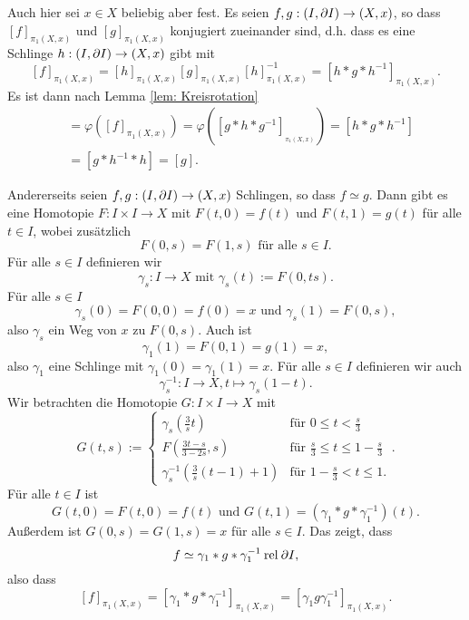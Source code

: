 \documentclass[a4paper,10pt]{article}
\begin{document}
\subsection{}
Auch hier sei $x \in X$ beliebig aber fest. Es seien $f, g : (I, \partial I) \to (X,x)$, so dass $[f]_{\pi_1(X,x)}$ und $[g]_{\pi_1(X,x)}$ konjugiert zueinander sind, d.h. dass es eine Schlinge $h : (I, \partial I) \to (X,x)$ gibt mit
\[
 [f]_{\pi_1(X,x)} = [h]_{\pi_1(X,x)} [g]_{\pi_1(X,x)} [h]_{\pi_1(X,x)}^{-1} = \left[h * g * h^{-1}\right]_{\pi_1(X,x)}.
\]
Es ist dann nach Lemma \ref{lem: Kreisrotation}
\begin{align*}
 [f]
 &= \varphi([f]_{\pi_1(X,x)})
 = \varphi\left(\left[g * h * g^{-1}\right]_{_{\pi_1(X,x)}}\right)
 = \left[h * g * h^{-1}\right] \\
 &= \left[g * h^{-1} * h \right]
 = [g].
\end{align*}

Andererseits seien $f,g : (I, \partial I) \to (X,x)$ Schlingen, so dass $f \simeq g$. Dann gibt es eine Homotopie $F : I \times I \to X$ mit $F(t,0) = f(t)$ und $F(t,1) = g(t)$ für alle $t \in I$, wobei zusätzlich
\[
 F(0,s) = F(1,s) \text{ für alle } s \in I.
\]
Für alle $s \in I$ definieren wir
\[
 \gamma_s : I \to X \text{ mit } \gamma_s(t) := F(0,ts).
\]
Für alle $s \in I$
\[
 \gamma_s(0) = F(0,0) = f(0) = x \text{ und }
 \gamma_s(1) = F(0,s),
\]
also $\gamma_s$ ein Weg von $x$ zu $F(0,s)$. Auch ist
\[
 \gamma_1(1) = F(0,1) = g(1) = x,
\]
also $\gamma_1$ eine Schlinge mit $\gamma_1(0) = \gamma_1(1) = x$. Für alle $s \in I$ definieren wir auch
\[
 \gamma_s^{-1} : I \to X, t \mapsto \gamma_s(1-t).
\]
Wir betrachten die Homotopie $G : I \times I \to X$ mit
\[
 G(t,s) :=
 \begin{cases}
  \gamma_s\left( \frac{3}{s} t \right)             & \text{für } 0 \leq t < \frac{s}{3} \\
  F\left( \frac{3t-s}{3-2s}, s\right)              & \text{für } \frac{s}{3} \leq t \leq 1-\frac{s}{3} \\
  \gamma_s^{-1}\left( \frac{3}{s}(t-1) + 1 \right) & \text{für } 1-\frac{s}{3} < t \leq 1.
 \end{cases}.
\]
Für alle $t \in I$ ist
\[
 G(t,0) = F(t,0) = f(t) \text{ und } G(t,1) = \left( \gamma_1 * g * \gamma_1^{-1} \right)(t).
\]
Außerdem ist $G(0,s) = G(1,s) = x$ für alle $s \in I$. Das zeigt, dass
\[
 f \simeq \gamma_1 * g * \gamma_1^{-1} \mathbin{\operatorname{rel}} \partial I,
\]
also dass
\[
 [f]_{\pi_1(X,x)}
 = \left[ \gamma_1 * g * \gamma_1^{-1} \right]_{\pi_1(X,x)}
 = \left[ \gamma_1 g \gamma_1^{-1} \right]_{\pi_1(X,x)}.
\]
\end{document}
